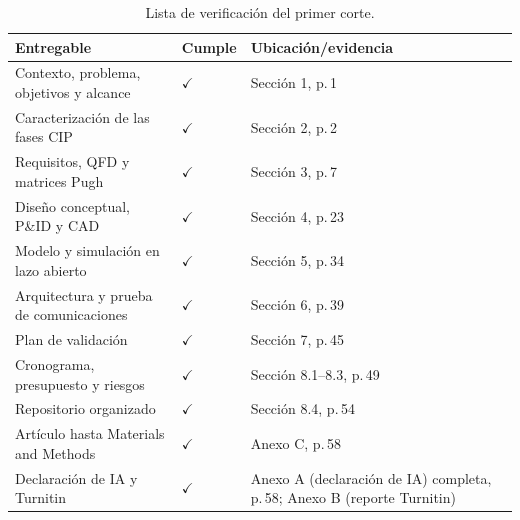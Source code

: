 \begin{table}[H]\centering\small\caption{Lista de verificación del primer corte.}
\begin{tabularx}{\textwidth}{Y C{1.6cm} L{4cm}}\toprule
\textbf{Entregable}&\textbf{Cumple}&\textbf{Ubicación/evidencia}\\\midrule
Contexto, problema, objetivos y alcance&$\checkmark$&Sección 1, p.\,1\\
Caracterización de las fases CIP&$\checkmark$&Sección 2, p.\,2\\
Requisitos, QFD y matrices Pugh&$\checkmark$&Sección 3, p.\,7\\
Diseño conceptual, P\&ID y CAD&$\checkmark$&Sección 4, p.\,23\\
Modelo y simulación en lazo abierto&$\checkmark$&Sección 5, p.\,34\\
Arquitectura y prueba de comunicaciones&$\checkmark$&Sección 6, p.\,39\\
Plan de validación&$\checkmark$&Sección 7, p.\,45\\
Cronograma, presupuesto y riesgos&$\checkmark$&Sección 8.1--8.3, p.\,49\\
Repositorio organizado&$\checkmark$&Sección 8.4, p.\,54\\
Artículo hasta Materials and Methods&$\checkmark$&Anexo C, p.\,58\\
Declaración de IA y Turnitin&$\checkmark$&Anexo A (declaración de IA) completa, p.\,58; Anexo B (reporte Turnitin)\\\bottomrule
\end{tabularx}\end{table}
